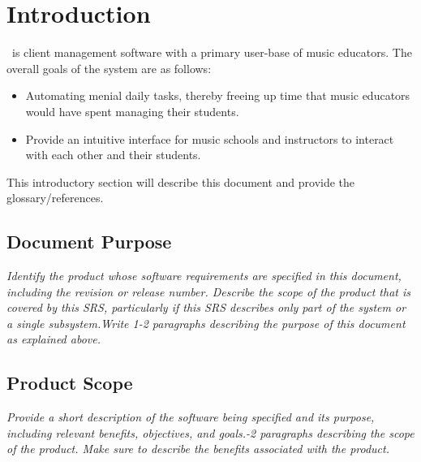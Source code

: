 
\section{Introduction}\label{sec:introduction}
    \projectName\ is client management software with a primary user-base of music educators. The overall goals of the system are as follows:
    \begin{itemize}
        \item Automating menial daily tasks, thereby freeing up time that music educators would have spent managing their students.
        \item Provide an intuitive interface for music schools and instructors to interact with each other and their students.
    \end{itemize}
    This introductory section will describe this document and provide the glossary/references.
    \subsection{Document Purpose}\label{sec:document-purpose}
        \emph{Identify the product whose software requirements are specified in this document, including the revision or release number. Describe the scope of the product that is covered by this SRS, particularly if this SRS describes only part of the system or a single subsystem.\gnl Write 1-2 paragraphs describing the purpose of this document as explained above.}
    \subsection{Product Scope}\label{sec:product-scope}
        \emph{Provide a short description of the software being specified and its purpose, including relevant benefits, objectives, and goals.-2 paragraphs describing the scope of the product. Make sure to describe the benefits associated with the product.}
